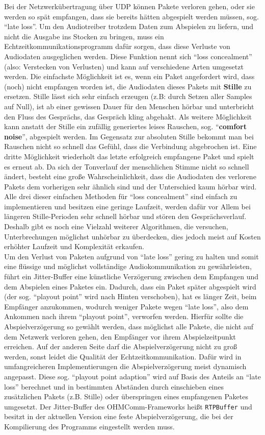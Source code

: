 Bei der Netzwerkübertragung über UDP können Pakete verloren gehen, oder sie werden so spät empfangen, dass sie bereits hätten abgespielt werden müssen, sog. \enquote{late loss}. Um den Audiotreiber trotzdem Daten zum Abspielen zu liefern, und nicht die Ausgabe ins Stocken zu bringen, muss ein Echtzeitkommunikationsprogramm dafür sorgen, dass diese Verluste von Audiodaten ausgeglichen werden. Diese Funktion nennt sich \enquote{loss concealment} (also: Verstecken von Verlusten) und kann auf verschiedene Arten umgesetzt werden. Die einfachste Möglichkeit ist es, wenn ein Paket angefordert wird, dass (noch) nicht empfangen worden ist, die Audiodaten dieses Pakets mit \textbf{Stille} zu ersetzen. Stille lässt sich sehr einfach erzeugen (z.B: durch Setzen aller Samples auf Null), ist ab einer gewissen Dauer für den Menschen hörbar und unterbricht den Fluss des Gesprächs, das Gespräch kling abgehakt. Als weitere Möglichkeit kann anstatt der Stille ein zufällig generiertes leises Rauschen, sog. \enquote{\textbf{comfort noise}}, abgespielt werden. Im Gegensatz zur absoluten Stille bekommt man bei Rauschen nicht so schnell das Gefühl, dass die Verbindung abgebrochen ist. Eine dritte Möglichkeit wiederholt das letzte erfolgreich empfangene Paket und spielt es erneut ab. Da sich der Tonverlauf der menschlichen Stimme nicht so schnell ändert, besteht eine große Wahrscheinlichkeit, dass die Audiodaten des verlorene Pakets dem vorherigen sehr ähnlich sind und der Unterschied kaum hörbar wird. Alle drei dieser einfachen Methoden für \enquote{loss concealment} sind einfach zu implementieren und besitzen eine geringe Laufzeit, werden dafür vor Allem bei längeren Stille-Perioden sehr schnell hörbar und stören den Gesprächsverlauf. Deshalb gibt es noch eine Vielzahl weiterer Algorithmen, die versuchen, Unterbrechungen möglichst unhörbar zu überdecken, dies jedoch meist auf Kosten erhöhter Laufzeit und Komplexität erkaufen.
\\
Um den Verlust von Paketen aufgrund von \enquote{late loss} gering zu halten und somit eine flüssige und möglichst vollständige Audiokommunikation zu gewährleisten, führt ein Jitter-Buffer eine künstliche Verzögerung zwischen dem Empfangen und dem Abspielen eines Paketes ein. Dadurch, dass ein Paket später abgespielt wird (der sog. \enquote{playout point} wird nach Hinten verschoben), hat es länger Zeit, beim Empfänger anzukommen, wodurch weniger Pakete wegen \enquote{late loss}, also dem Ankommen nach ihrem \enquote{playout point}, verworfen werden. Hierfür sollte die Abspielverzögerung so gewählt werden, dass möglichst alle Pakete, die nicht auf dem Netzwerk verloren gehen, den Empfänger vor ihrem Abspielzeitpunkt erreichen. Auf der anderen Seite darf die Abspielverzögerung nicht zu groß werden, sonst leidet die Qualität der Echtzeitkommunikation. Dafür wird in umfangreicheren Implementierungen die Abspielverzögerung meist dynamisch angepasst. Diese sog. \enquote{playout point adaption} wird auf Basis des Anteils an \enquote{late loss} berechnet und in bestimmten Abständen durch einschieben eines zusätzlichen Pakets (z.B. Stille) oder überspringen eines empfangenen Paketes umgesetzt. Der Jitter-Buffer des OHMComm-Frameworks heißt \texttt{RTPBuffer} und besitzt in der aktuellen Version eine feste Abspielverzögerung, die bei der Kompilierung des Programms eingestellt werden muss.
